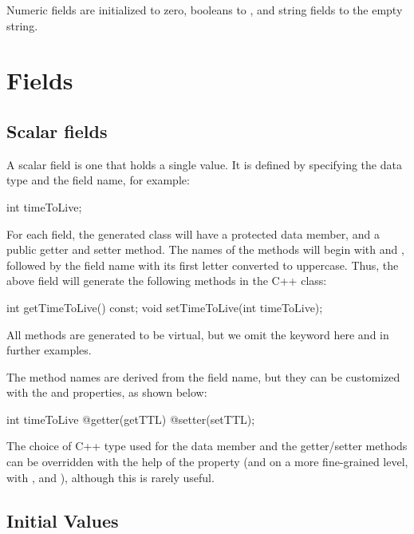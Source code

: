 Numeric fields are initialized to zero, booleans to , and string
fields to the empty string.


\section{Fields}
\label{sec:msg-defs:fields}

\subsection{Scalar fields}
\label{sec:msg-defs:scalar-fields}

A scalar field is one that holds a single value. It is defined by specifying the
data type and the field name, for example:

\begin{msg}
int timeToLive;
\end{msg}

For each field, the generated class will have a protected data member, and a
public getter and setter method. The names of the methods will begin with
 and , followed by the field name with its first letter
converted to uppercase. Thus, the above field will generate the following
methods in the C++ class:

\begin{cpp}
int getTimeToLive() const;
void setTimeToLive(int timeToLive);
\end{cpp}

\begin{note}
All methods are generated to be virtual, but we omit the 
keyword here and in further examples.
\end{note}

The method names are derived from the field name, but they can be customized
with the  and  properties, as shown below:

\begin{msg}
int timeToLive @getter(getTTL) @setter(setTTL);
\end{msg}

The choice of C++ type used for the data member and the getter/setter methods
can be overridden with the help of the  property (and on a more
fine-grained level, with ,  and
), although this is rarely useful.


\subsection{Initial Values}
\label{sec:msg-defs:initial-values}

